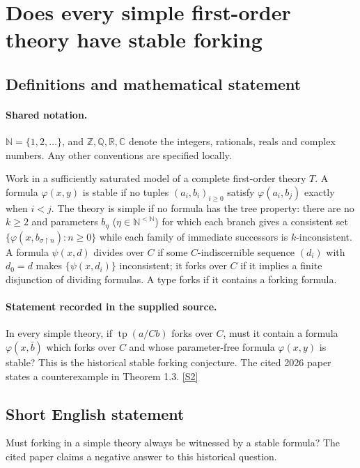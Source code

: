 \documentclass[11pt]{article}
\newcommand{\sref}[2]{\hyperlink{source:#1:#2}{[S#2]}}
\begin{document}
\section{Does every simple first-order theory have stable forking}\label{statement}

\subsection{Definitions and mathematical statement}

\paragraph{Shared notation.}$\mathbb N=\{1,2,\ldots\}$, and $\mathbb Z,\mathbb Q,\mathbb R,\mathbb C$ denote the integers, rationals, reals and complex numbers. Any other conventions are specified locally.


Work in a sufficiently saturated model of a complete first-order theory $T$. A formula $\varphi(x,y)$ is stable if no tuples $(a_i,b_i)_{i\ge0}$ satisfy $\varphi(a_i,b_j)$ exactly when $i<j$. The theory is simple if no formula has the tree property: there are no $k\ge2$ and parameters $b_\eta$ ($\eta\in\mathbb N^{<\mathbb N}$) for which each branch gives a consistent set $\{\varphi(x,b_{\sigma\upharpoonright n}):n\ge0\}$ while each family of immediate successors is $k$-inconsistent. A formula $\psi(x,d)$ divides over $C$ if some $C$-indiscernible sequence $(d_i)$ with $d_0=d$ makes $\{\psi(x,d_i)\}$ inconsistent; it forks over $C$ if it implies a finite disjunction of dividing formulas. A type forks if it contains a forking formula.
\paragraph{Statement recorded in the supplied source.}
In every simple theory, if $\operatorname{tp}(a/Cb)$ forks over $C$, must it contain a formula $\varphi(x,\bar b)$ which forks over $C$ and whose parameter-free formula $\varphi(x,y)$ is stable? This is the historical stable forking conjecture. The cited 2026 paper states a counterexample in Theorem 1.3. \sref{statement}{2}
\subsection{Short English statement}
Must forking in a simple theory always be witnessed by a stable formula? The cited paper claims a negative answer to this historical question.
\end{document}
